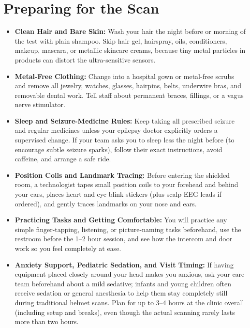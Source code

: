 \section{Preparing for the Scan}
\begin{itemize}
  \item \textbf{Clean Hair and Bare Skin:} Wash your hair the night before or morning of the test with plain shampoo. Skip hair gel, hairspray, oils, conditioners, makeup, mascara, or metallic skincare creams, because tiny metal particles in products can distort the ultra-sensitive sensors.
  \item \textbf{Metal-Free Clothing:} Change into a hospital gown or metal-free scrubs and remove all jewelry, watches, glasses, hairpins, belts, underwire bras, and removable dental work. Tell staff about permanent braces, fillings, or a vagus nerve stimulator.
  \item \textbf{Sleep and Seizure-Medicine Rules:} Keep taking all prescribed seizure and regular medicines unless your epilepsy doctor explicitly orders a supervised change. If your team asks you to sleep less the night before (to encourage subtle seizure sparks), follow their exact instructions, avoid caffeine, and arrange a safe ride.
  \item \textbf{Position Coils and Landmark Tracing:} Before entering the shielded room, a technologist tapes small position coils to your forehead and behind your ears, places heart and eye-blink stickers (plus scalp EEG leads if ordered), and gently traces landmarks on your nose and ears.
  \item \textbf{Practicing Tasks and Getting Comfortable:} You will practice any simple finger-tapping, listening, or picture-naming tasks beforehand, use the restroom before the 1--2 hour session, and see how the intercom and door work so you feel completely at ease.
  \item \textbf{Anxiety Support, Pediatric Sedation, and Visit Timing:} If having equipment placed closely around your head makes you anxious, ask your care team beforehand about a mild sedative; infants and young children often receive sedation or general anesthesia to help them stay completely still during traditional helmet scans. Plan for up to 3--4 hours at the clinic overall (including setup and breaks), even though the actual scanning rarely lasts more than two hours.
\end{itemize}

